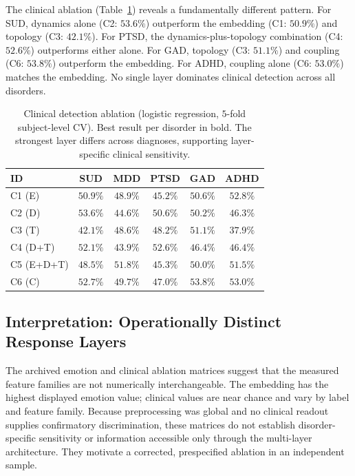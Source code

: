The clinical ablation (Table~\ref{tab:clinical_ablation}) reveals a fundamentally different pattern. For SUD, dynamics alone (C2: $53.6\%$) outperform the embedding (C1: $50.9\%$) and topology (C3: $42.1\%$). For PTSD, the dynamics-plus-topology combination (C4: $52.6\%$) outperforms either alone. For GAD, topology (C3: $51.1\%$) and coupling (C6: $53.8\%$) outperform the embedding. For ADHD, coupling alone (C6: $53.0\%$) matches the embedding. No single layer dominates clinical detection across all disorders.

\begin{table}[t]
\centering
\caption{Clinical detection ablation (logistic regression, $5$-fold subject-level CV). Best result per disorder in bold. The strongest layer differs across diagnoses, supporting layer-specific clinical sensitivity.}
\label{tab:clinical_ablation}
\small
\begin{tabular}{lccccc}
\hline
\textbf{ID} & \textbf{SUD} & \textbf{MDD} & \textbf{PTSD} & \textbf{GAD} & \textbf{ADHD} \\
\hline
C1 (E) & $50.9\%$ & $48.9\%$ & $45.2\%$ & $50.6\%$ & $52.8\%$ \\
C2 (D) & $\mathbf{53.6\%}$ & $44.6\%$ & $50.6\%$ & $50.2\%$ & $46.3\%$ \\
C3 (T) & $42.1\%$ & $48.6\%$ & $48.2\%$ & $51.1\%$ & $37.9\%$ \\
C4 (D+T) & $52.1\%$ & $43.9\%$ & $\mathbf{52.6\%}$ & $46.4\%$ & $46.4\%$ \\
C5 (E+D+T) & $48.5\%$ & $\mathbf{51.8\%}$ & $45.3\%$ & $50.0\%$ & $51.5\%$ \\
C6 (C) & $52.7\%$ & $49.7\%$ & $47.0\%$ & $\mathbf{53.8\%}$ & $\mathbf{53.0\%}$ \\
\hline
\end{tabular}
\end{table}

\subsection{Interpretation: Operationally Distinct Response Layers}

The archived emotion and clinical ablation matrices suggest that the measured feature families are not numerically interchangeable. The embedding has the highest displayed emotion value; clinical values are near chance and vary by label and feature family. Because preprocessing was global and no clinical readout supplies confirmatory discrimination, these matrices do not establish disorder-specific sensitivity or information accessible only through the multi-layer architecture. They motivate a corrected, prespecified ablation in an independent sample.


